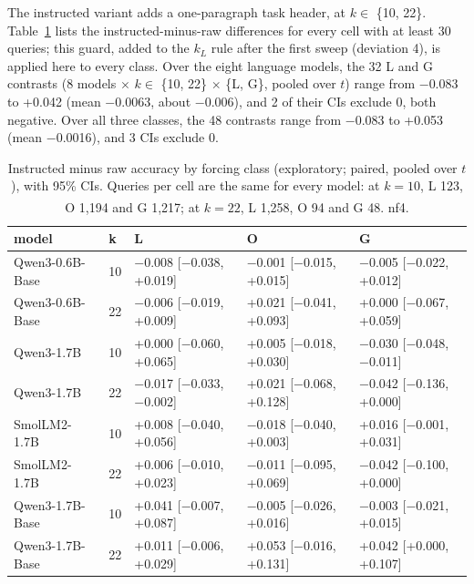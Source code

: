 \documentclass[11pt]{article}
\begin{document}
The instructed variant adds a one-paragraph task header, at $k \in$ \{10, 22\}. Table~\ref{tab:app-cal-instr} lists the instructed-minus-raw differences for every cell with at least 30 queries; this guard, added to the $k_L$ rule after the first sweep (deviation 4), is applied here to every class. Over the eight language models, the 32 L and G contrasts (8 models $\times$ $k \in$ \{10, 22\} $\times$ \{L, G\}, pooled over $t$) range from $-$0.083 to +0.042 (mean $-$0.0063, about $-$0.006), and 2 of their CIs exclude 0, both negative. Over all three classes, the 48 contrasts range from $-$0.083 to +0.053 (mean $-$0.0016), and 3 CIs exclude 0.

\begin{table}[tbp]
\centering
\small
\caption{Instructed minus raw accuracy by forcing class (exploratory; paired, pooled over $t$), with 95\% CIs. Queries per cell are the same for every model: at $k = 10$, L 123, O 1,194 and G 1,217; at $k = 22$, L 1,258, O 94 and G 48. \textsuperscript{\dag} nf4.}\label{tab:app-cal-instr}
\begin{tabularx}{\linewidth}{@{}>{\raggedright\arraybackslash\hsize=0.8008\hsize}Xl>{\raggedright\arraybackslash\hsize=1.0664\hsize}X>{\raggedright\arraybackslash\hsize=1.0664\hsize}X>{\raggedright\arraybackslash\hsize=1.0664\hsize}X@{}}
\toprule
model & k & L & O & G \\
\midrule
Qwen3-0.6B-Base & 10 & $-$0.008 [$-$0.038, +0.019] & $-$0.001 [$-$0.015, +0.015] & $-$0.005 [$-$0.022, +0.012] \\
Qwen3-0.6B-Base & 22 & $-$0.006 [$-$0.019, +0.009] & +0.021 [$-$0.041, +0.093] & +0.000 [$-$0.067, +0.059] \\
Qwen3-1.7B & 10 & +0.000 [$-$0.060, +0.065] & +0.005 [$-$0.018, +0.030] & $-$0.030 [$-$0.048, $-$0.011] \\
Qwen3-1.7B & 22 & $-$0.017 [$-$0.033, $-$0.002] & +0.021 [$-$0.068, +0.128] & $-$0.042 [$-$0.136, +0.000] \\
SmolLM2-1.7B & 10 & +0.008 [$-$0.040, +0.056] & $-$0.018 [$-$0.040, +0.003] & +0.016 [$-$0.001, +0.031] \\
SmolLM2-1.7B & 22 & +0.006 [$-$0.010, +0.023] & $-$0.011 [$-$0.095, +0.069] & $-$0.042 [$-$0.100, +0.000] \\
Qwen3-1.7B-Base & 10 & +0.041 [$-$0.007, +0.087] & $-$0.005 [$-$0.026, +0.016] & $-$0.003 [$-$0.021, +0.015] \\
Qwen3-1.7B-Base & 22 & +0.011 [$-$0.006, +0.029] & +0.053 [$-$0.016, +0.131] & +0.042 [+0.000, +0.107] \\

\end{tabularx}
\end{table}
\end{document}
